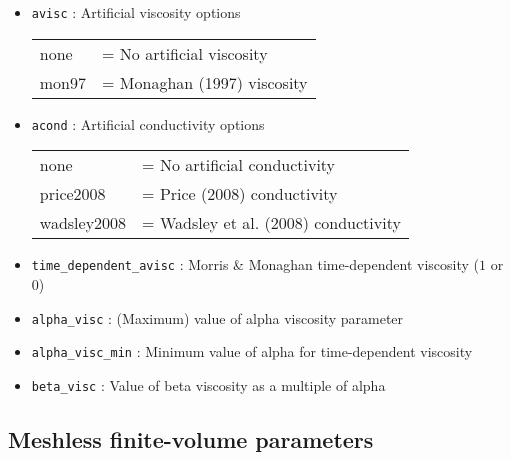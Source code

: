 \documentclass[a4paper]{article}
\newcommand{\var}[1]{\texttt{#1}}
\begin{document}
\begin{itemize}

\item \var{avisc} : Artificial viscosity options \\
\begin{tabular}{ll}
none  & = No artificial viscosity \\
mon97 & = Monaghan (1997) viscosity
\end{tabular}

\item \var{acond} : Artificial conductivity options \\
\begin{tabular}{ll}
none        & = No artificial conductivity \\
price2008   & = Price (2008) conductivity \\
wadsley2008 & = Wadsley et al. (2008) conductivity
\end{tabular}

\item \var{time\_dependent\_avisc} : Morris \& Monaghan time-dependent viscosity ($1$ or $0$)

\item \var{alpha\_visc} : (Maximum) value of alpha viscosity parameter

\item \var{alpha\_visc\_min} : Minimum value of alpha for time-dependent viscosity

\item \var{beta\_visc} : Value of beta viscosity as a multiple of alpha


\end{itemize}



\subsection{Meshless finite-volume parameters}
\end{document}

